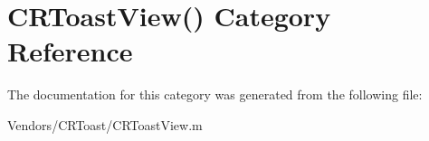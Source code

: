 \hypertarget{category_c_r_toast_view_07_08}{}\section{C\+R\+Toast\+View() Category Reference}
\label{category_c_r_toast_view_07_08}


The documentation for this category was generated from the following file\+:\begin{DoxyCompactItemize}
\item 
Vendors/\+C\+R\+Toast/C\+R\+Toast\+View.\+m\end{DoxyCompactItemize}
